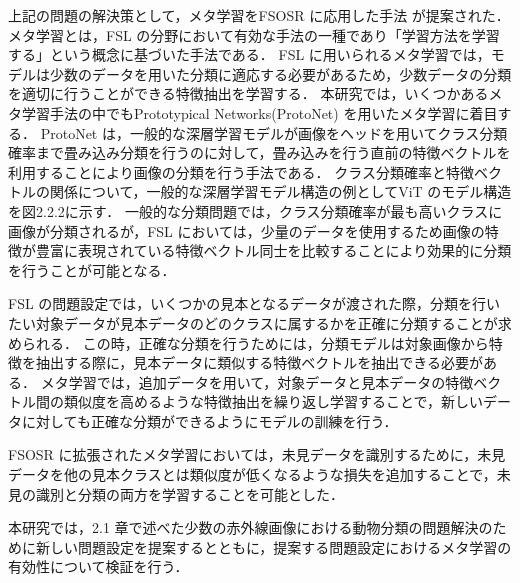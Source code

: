 \documentclass[a4paper,11pt,nomag]{jsreport}
\begin{document}
上記の問題の解決策として，メタ学習をFSOSR に応用した手法\cite{peeler} が提案された．
メタ学習とは，FSL の分野において有効な手法の一種であり「学習方法を学習する」という概念に基づいた手法である．
FSL に用いられるメタ学習では，モデルは少数のデータを用いた分類に適応する必要があるため，少数データの分類を適切に行うことができる特徴抽出を学習する．
本研究では，いくつかあるメタ学習手法の中でもPrototypical Networks(ProtoNet)\cite{protonet} を用いたメタ学習に着目する．
ProtoNet は，一般的な深層学習モデルが画像をヘッドを用いてクラス分類確率まで畳み込み分類を行うのに対して，畳み込みを行う直前の特徴ベクトルを利用することにより画像の分類を行う手法である．
クラス分類確率と特徴ベクトルの関係について，一般的な深層学習モデル構造の例としてViT のモデル構造を図2.2.2に示す．
一般的な分類問題では，クラス分類確率が最も高いクラスに画像が分類されるが，FSL においては，少量のデータを使用するため画像の特徴が豊富に表現されている特徴ベクトル同士を比較することにより効果的に分類を行うことが可能となる．

FSL の問題設定では，いくつかの見本となるデータが渡された際，分類を行いたい対象データが見本データのどのクラスに属するかを正確に分類することが求められる．
この時，正確な分類を行うためには，分類モデルは対象画像から特徴を抽出する際に，見本データに類似する特徴ベクトルを抽出できる必要がある．
メタ学習では，追加データを用いて，対象データと見本データの特徴ベクトル間の類似度を高めるような特徴抽出を繰り返し学習することで，新しいデータに対しても正確な分類ができるようにモデルの訓練を行う．

FSOSR に拡張されたメタ学習においては，未見データを識別するために，未見データを他の見本クラスとは類似度が低くなるような損失を追加することで，未見の識別と分類の両方を学習することを可能とした．

本研究では，2.1 章で述べた少数の赤外線画像における動物分類の問題解決のために新しい問題設定を提案するとともに，提案する問題設定におけるメタ学習の有効性について検証を行う．




\end{document}
